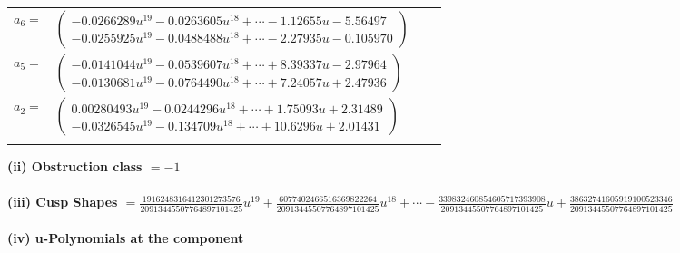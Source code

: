 \documentclass[1p]{elsarticle_modified}
\theoremstyle{definition}
\begin{document}
\begin{tabular}{m{7pt} m{180pt} m{7pt} m{180pt} }
\flushright $a_{6}=$&$\begin{pmatrix}-0.0266289 u^{19}-0.0263605 u^{18}+\cdots-1.12655 u-5.56497\\-0.0255925 u^{19}-0.0488488 u^{18}+\cdots-2.27935 u-0.105970\end{pmatrix}$ \\
\flushright $a_{5}=$&$\begin{pmatrix}-0.0141044 u^{19}-0.0539607 u^{18}+\cdots+8.39337 u-2.97964\\-0.0130681 u^{19}-0.0764490 u^{18}+\cdots+7.24057 u+2.47936\end{pmatrix}$ \\
\flushright $a_{2}=$&$\begin{pmatrix}0.00280493 u^{19}-0.0244296 u^{18}+\cdots+1.75093 u+2.31489\\-0.0326545 u^{19}-0.134709 u^{18}+\cdots+10.6296 u+2.01431\end{pmatrix}$\\&\end{tabular}
\flushleft \textbf{(ii) Obstruction class $= -1$}\\~\\
\flushleft \textbf{(iii) Cusp Shapes $= \frac{1916248316412301273576}{20913445507764897101425} u^{19}+\frac{6077402466516369822264}{20913445507764897101425} u^{18}+\cdots-\frac{339832460854605717393908}{20913445507764897101425} u+\frac{38632741605919100523346}{20913445507764897101425}$}\\~\\
\newpage\renewcommand{\arraystretch}{1}
\flushleft \textbf{(iv) u-Polynomials at the component}\newline \\
\end{document}
